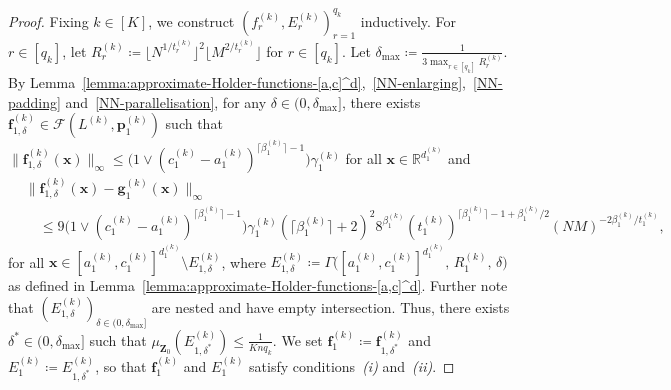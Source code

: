 \documentclass[12pt]{article}
\begin{document}
\begin{proof}
    Fixing $k\in[K]$, we construct $(f^{(k)}_r,E^{(k)}_r)_{r=1}^{q_k}$ inductively.  For $r \in [q_k]$, let $R^{(k)}_r \coloneqq \lfloor N^{1/t^{(k)}_r} \rfloor^2 \lfloor M^{2/t^{(k)}_r} \rfloor$ for $r \in [q_k]$. Let $\delta_{\max} \coloneqq \frac{1}{3\max_{r\in[q_k]}R_r^{(k)}}$. By Lemma~\ref{lemma:approximate-Holder-functions-[a,c]^d},~\ref{NN-enlarging},~\ref{NN-padding} and~\ref{NN-parallelisation}, for any $\delta\in(0,\delta_{\max}]$, there exists $\bm f^{(k)}_{1,\delta} \in \mathcal{F}(L^{(k)}, \bm p^{(k)}_1)$ such that $\|\bm f_{1,\delta}^{(k)}(\bm x)\|_{\infty} \leq \bigl( 1 \vee (c_1^{(k)} - a_1^{(k)})^{\lceil \beta_1^{(k)} \rceil - 1} \bigr) \gamma_1^{(k)}$ for all $\bm x \in \mathbb{R}^{d_1^{(k)}}$ and
    \begin{align*}
        &\bigl\|\bm f^{(k)}_{1,\delta}(\bm x) - \bm g^{(k)}_1(\bm x)\bigr\|_{\infty}\\
        &\quad \leq 9 \bigl( 1 \vee (c_1^{(k)} - a_1^{(k)})^{\lceil \beta_1^{(k)} \rceil - 1} \bigr) \gamma^{(k)}_1 (\lceil \beta^{(k)}_1 \rceil +2)^2 8^{\beta_1^{(k)}} (t^{(k)}_1)^{\lceil \beta_1^{(k)} \rceil - 1 + \beta^{(k)}_1/2} (NM)^{-2\beta^{(k)}_1 / t^{(k)}_1},
    \end{align*}
    for all $\bm x \in [a^{(k)}_1, c^{(k)}_1]^{d^{(k)}_1} \setminus E^{(k)}_{1,\delta}$, where $E^{(k)}_{1,\delta} \coloneqq \Gamma\bigl([a^{(k)}_1, c^{(k)}_1]^{d^{(k)}_1},\, R^{(k)}_1,\, \delta\bigr)$ as defined in Lemma~\ref{lemma:approximate-Holder-functions-[a,c]^d}. Further note that $(E^{(k)}_{1,\delta})_{\delta\in(0,\delta_{\max}]}$ are nested and have empty intersection.
    Thus, there exists $\delta^* \in (0,\delta_{\max}]$ such that $\mu_{\bm Z_0}(E^{(k)}_{1,\delta^*}) \leq \frac{1}{Kn q_k}$. We set $\bm f^{(k)}_1 \coloneqq \bm f^{(k)}_{1,\delta^*}$ and $E^{(k)}_1 \coloneqq E^{(k)}_{1,\delta^*}$, so that $\bm f^{(k)}_1$ and $E^{(k)}_1$ satisfy conditions~\emph{(i)} and~\emph{(ii)}.


\end{proof}
\end{document}
